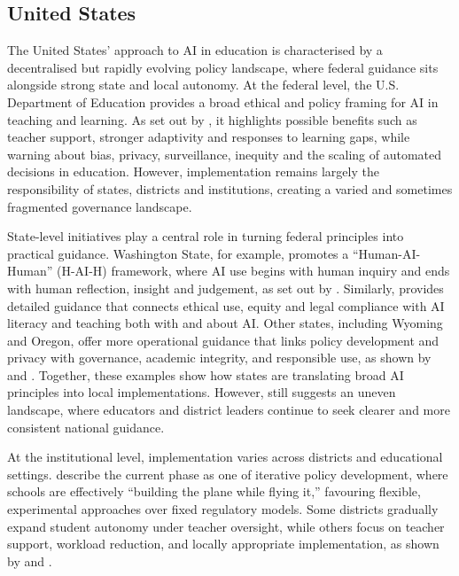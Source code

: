 \subsection{United States}

The United States' approach to AI in education is characterised by a decentralised
but rapidly evolving policy landscape, where federal guidance sits alongside strong
state and local autonomy. At the federal level, the U.S. Department of Education
provides a broad ethical and policy framing for AI in teaching and learning. As set
out by \cite{usdoe2023aifuture}, it highlights possible benefits such as teacher
support, stronger adaptivity and responses to learning gaps, while warning about
bias, privacy, surveillance, inequity and the scaling of automated decisions in
education. However, implementation remains largely the responsibility of states,
districts and institutions, creating a varied and sometimes fragmented governance
landscape.

State-level initiatives play a central role in turning federal principles into
practical guidance. Washington State, for example, promotes a ``Human-AI-Human''
(H-AI-H) framework, where AI use begins with human inquiry and ends with human
reflection, insight and judgement, as set out by
\cite{washingtonospi2024implementing}. Similarly, \cite{massdese2025guidance}
provides detailed guidance that connects ethical use, equity and legal compliance
with AI literacy and teaching both with and about AI. Other states, including Wyoming
and Oregon, offer more operational guidance that links policy development and privacy
with governance, academic integrity, and responsible use, as shown by
\cite{wyomingwde2025guidance} and \cite{oregonode2023genai}. Together, these examples
show how states are translating broad AI principles into local implementations.
However, \cite{panorama2024fourstates} still suggests an uneven landscape, where
educators and district leaders continue to seek clearer and more consistent national
guidance.

At the institutional level, implementation varies across districts and educational
settings. \cite{reich2025guideai} describe the current phase as one of iterative
policy development, where schools are effectively ``building the plane while flying
it,'' favouring flexible, experimental approaches over fixed regulatory models. Some
districts gradually expand student autonomy under teacher oversight, while others
focus on teacher support, workload reduction, and locally appropriate implementation,
as shown by \cite{northport2025guidelines} and \cite{excelsiormat2025aipolicy}.

